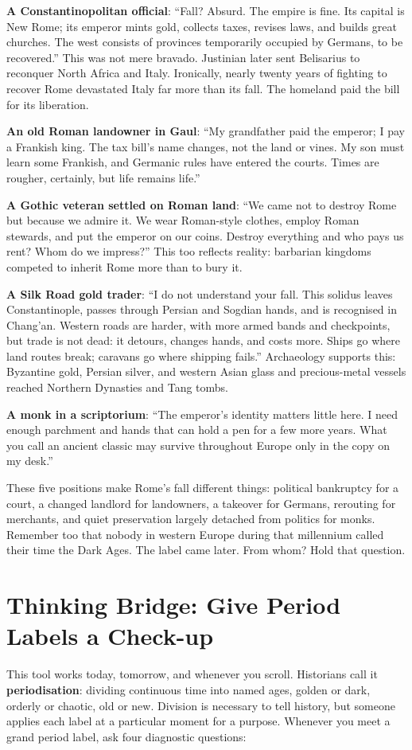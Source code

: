 \textbf{A Constantinopolitan official}: ``Fall? Absurd. The empire is fine. Its capital is New Rome; its emperor mints gold, collects taxes, revises laws, and builds great churches. The west consists of provinces temporarily occupied by Germans, to be recovered.'' This was not mere bravado. Justinian later sent Belisarius to reconquer North Africa and Italy. Ironically, nearly twenty years of fighting to recover Rome devastated Italy far more than its fall. The homeland paid the bill for its liberation.

\textbf{An old Roman landowner in Gaul}: ``My grandfather paid the emperor; I pay a Frankish king. The tax bill's name changes, not the land or vines. My son must learn some Frankish, and Germanic rules have entered the courts. Times are rougher, certainly, but life remains life.''

\textbf{A Gothic veteran settled on Roman land}: ``We came not to destroy Rome but because we admire it. We wear Roman-style clothes, employ Roman stewards, and put the emperor on our coins. Destroy everything and who pays us rent? Whom do we impress?'' This too reflects reality: barbarian kingdoms competed to inherit Rome more than to bury it.

\textbf{A Silk Road gold trader}: ``I do not understand your fall. This solidus leaves Constantinople, passes through Persian and Sogdian hands, and is recognised in Chang'an. Western roads are harder, with more armed bands and checkpoints, but trade is not dead: it detours, changes hands, and costs more. Ships go where land routes break; caravans go where shipping fails.'' Archaeology supports this: Byzantine gold, Persian silver, and western Asian glass and precious-metal vessels reached Northern Dynasties and Tang tombs.

\textbf{A monk in a scriptorium}: ``The emperor's identity matters little here. I need enough parchment and hands that can hold a pen for a few more years. What you call an ancient classic may survive throughout Europe only in the copy on my desk.''

These five positions make Rome's fall different things: political bankruptcy for a court, a changed landlord for landowners, a takeover for Germans, rerouting for merchants, and quiet preservation largely detached from politics for monks. Remember too that nobody in western Europe during that millennium called their time the Dark Ages. The label came later. From whom? Hold that question.

\section[Thinking Bridge: Checking Era Labels]{Thinking Bridge: Give Period Labels a Check-up}
This tool works today, tomorrow, and whenever you scroll. Historians call it \textbf{periodisation}: dividing continuous time into named ages, golden or dark, orderly or chaotic, old or new. Division is necessary to tell history, but someone applies each label at a particular moment for a purpose. Whenever you meet a grand period label, ask four diagnostic questions:

